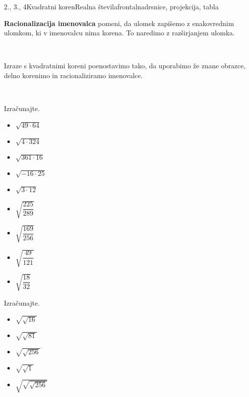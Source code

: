 \begin{priprava}{2., 3., 4}{}{Kvadratni koren}{Realna števila}{frontalna}{drsnice, projekcija, tabla}
                

                \textbf{Racionalizacija imenovalca} pomeni, da ulomek zapišemo z enakovrednim ulomkom, ki v imenovalcu nima korena.
                To naredimo z razširjanjem ulomka.
            
                    ~~
            
                Izraze s kvadratnimi koreni poenostavimo tako, da uporabimo že znane obrazce, delno korenimo in racionaliziramo imenovalce.
            
        ~~~\\


        \begin{multicols}{2}
            

            \begin{naloga}
                Izračunajte.
                \begin{itemize}
                        \item $\sqrt{49\cdot 64}$ 
                        \item $\sqrt{4\cdot 324}$ 
                        \item $\sqrt{361\cdot 16}$ 
                        \item $\sqrt{-16\cdot 25}$ 
                        \item $\sqrt{3\cdot 12}$ 
                        \item $\sqrt{\dfrac{225}{289}}$ 
                        \item $\sqrt{\dfrac{169}{256}}$ 
                        \item $\sqrt{\dfrac{49}{121}}$ 
                        \item $\sqrt{\dfrac{18}{32}}$ 
                \end{itemize}
            \end{naloga}
        

        
            \begin{naloga}
                Izračunajte.
                \begin{itemize}
                        \item $\sqrt{\sqrt{16}}$ 
                        \item $\sqrt{\sqrt{81}}$ 
                        \item $\sqrt{\sqrt{256}}$ 
                        \item $\sqrt{\sqrt{1}}$ 
                        \item $\sqrt{\sqrt{\sqrt{256}}}$ 
                \end{itemize}
            \end{naloga}
        

\end{multicols}
\end{priprava}

